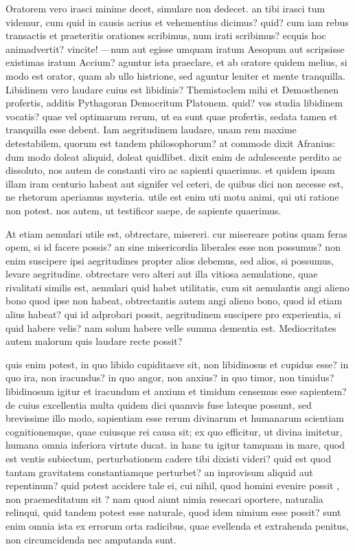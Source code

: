  Oratorem vero irasci minime decet, simulare non dedecet. an tibi irasci tum videmur, cum quid in causis acrius et vehementius dicimus? quid? cum iam rebus transactis et praeteritis orationes scribimus, num irati scribimus? ecquis hoc animadvertit? vincite! —num aut egisse umquam iratum Aesopum aut scripsisse existimas iratum Accium? aguntur ista praeclare, et ab oratore quidem melius, si modo est orator, quam ab ullo histrione, sed aguntur leniter et mente tranquilla. Libidinem vero laudare cuius est libidinis? Themistoclem mihi et Demosthenen profertis, additis Pythagoran Democritum Platonem. quid? vos studia libidinem vocatis? quae vel optimarum rerum, ut ea sunt quae profertis, sedata tamen et tranquilla esse debent. Iam aegritudinem laudare, unam rem maxime detestabilem, quorum est tandem philosophorum? at commode dixit Afranius: dum modo doleat aliquid, doleat quidlibet. dixit enim de adulescente perdito ac dissoluto, nos autem de constanti viro ac sapienti quaerimus. et quidem ipsam illam iram centurio habeat aut signifer vel ceteri, de quibus dici non necesse est, ne rhetorum aperiamus mysteria. utile est enim uti motu animi, qui uti ratione non potest. nos autem, ut testificor saepe, de sapiente quaerimus.

 At etiam aemulari utile est, obtrectare, misereri. cur misereare potius quam feras opem, si id facere possis? an sine misericordia liberales esse non possumus? non enim suscipere ipsi aegritudines propter alios debemus, sed alios, si possumus, levare aegritudine. obtrectare vero alteri aut illa vitiosa aemulatione, quae rivalitati similis est, aemulari quid habet utilitatis, cum sit aemulantis angi alieno bono quod ipse non habeat, obtrectantis autem angi alieno bono, quod id etiam alius habeat? qui id adprobari possit, aegritudinem suscipere pro experientia, si quid habere velis? nam solum habere velle summa dementia est. Mediocritates autem malorum quis laudare recte possit?

 quis enim potest, in quo libido cupiditasve sit, non libidinosus et cupidus esse? in quo ira, non iracundus? in quo angor, non anxius? in quo timor, non timidus? libidinosum igitur et iracundum et anxium et timidum censemus esse sapientem? de cuius excellentia multa quidem dici quamvis fuse lateque possunt, sed brevissime illo modo, sapientiam esse rerum divinarum et humanarum scientiam cognitionemque, quae cuiusque rei causa sit; ex quo efficitur, ut divina imitetur, humana omnia inferiora virtute ducat. in hanc tu igitur tamquam in mare, quod est ventis subiectum, perturbationem cadere tibi dixisti videri? quid est quod tantam gravitatem constantiamque perturbet? an inprovisum aliquid aut repentinum? quid potest accidere tale ei, cui nihil, quod homini evenire possit , non praemeditatum sit ? nam quod aiunt nimia resecari oportere, naturalia relinqui, quid tandem potest esse naturale, quod idem nimium esse possit? sunt enim omnia ista ex errorum orta radicibus, quae evellenda et extrahenda penitus, non circumcidenda nec amputanda sunt.

